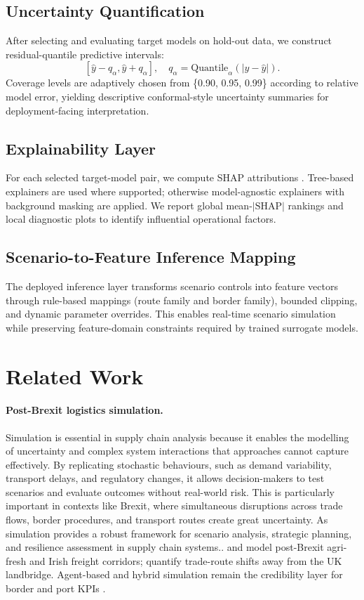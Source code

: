 \documentclass[12pt,twocolumn,a4paper]{article}
\theoremstyle{plain}
\theoremstyle{definition}
\theoremstyle{remark}
\begin{document}
\subsection{Uncertainty Quantification}
After selecting and evaluating target models on hold-out data, we construct residual-quantile predictive intervals:
\[
[\hat{y}-q_\alpha,\hat{y}+q_\alpha], \quad q_\alpha=\mathrm{Quantile}_\alpha(|y-\hat{y}|).
\]
Coverage levels are adaptively chosen from \{0.90, 0.95, 0.99\} according to relative model error, yielding descriptive conformal-style uncertainty summaries \cite{vovk2005algorithmic,angelopoulos2021gentle} for deployment-facing interpretation.

\subsection{Explainability Layer}
For each selected target-model pair, we compute SHAP attributions \cite{lundberg2017shap}. Tree-based explainers are used where supported; otherwise model-agnostic explainers with background masking are applied. We report global mean-$|\mathrm{SHAP}|$ rankings and local diagnostic plots to identify influential operational factors.

\subsection{Scenario-to-Feature Inference Mapping}
The deployed inference layer transforms scenario controls into feature vectors through rule-based mappings (route family and border family), bounded clipping, and dynamic parameter overrides. This enables real-time scenario simulation while preserving feature-domain constraints required by trained surrogate models.

\section{Related Work}
\label{sec:related}

\paragraph{Post-Brexit logistics simulation.}
Simulation is essential in supply chain analysis because it enables the modelling of uncertainty and complex system interactions that approaches cannot capture effectively. By replicating stochastic behaviours, such as demand variability, transport delays, and regulatory changes, it allows decision-makers to test scenarios and evaluate outcomes without real-world risk. This is particularly important in contexts like Brexit, where simultaneous disruptions across trade flows, border procedures, and transport routes create great uncertainty. As simulation provides a robust framework for scenario analysis, strategic planning, and resilience assessment in supply chain systems.\citet{Ivanov2021}.\citet{mahfouz2019} and \citet{mahfouz2020} model post-Brexit agri-fresh and Irish freight corridors; \citet{copenhagen2018} quantify trade-route shifts away from the UK landbridge.
Agent-based and hybrid simulation remain the credibility layer for border and port KPIs \citep{ivanov2025,byrne2009,amroune2019}.
\end{document}
